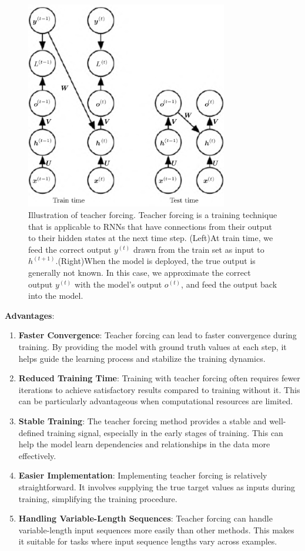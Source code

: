 \documentclass{report}
\begin{document}
\begin{figure}[ht]
	\includegraphics[width=250pt]{40}
	\centering
	\caption{Illustration of teacher forcing. Teacher forcing is a training technique that is applicable to RNNs that have connections from their output to their hidden states at the next time step. (Left)At train time, we feed the correct output $y^{(t)}$ drawn from the train set as input to $h^{(t+1)}$.(Right)When the model is deployed, the true output is generally not known. In this case, we approximate the correct output $y^{(t)}$ with the model’s output $o^{(t)}$, and feed the output back into the model.}
\end{figure}

\textbf{Advantages}:
\begin{enumerate}
\item \textbf{Faster Convergence}: Teacher forcing can lead to faster convergence during training. By providing the model with ground truth values at each step, it helps guide the learning process and stabilize the training dynamics.

\item \textbf{Reduced Training Time}: Training with teacher forcing often requires fewer iterations to achieve satisfactory results compared to training without it. This can be particularly advantageous when computational resources are limited.

\item \textbf{Stable Training}: The teacher forcing method provides a stable and well-defined training signal, especially in the early stages of training. This can help the model learn dependencies and relationships in the data more effectively.

\item \textbf{Easier Implementation}: Implementing teacher forcing is relatively straightforward. It involves supplying the true target values as inputs during training, simplifying the training procedure.

\item \textbf{Handling Variable-Length Sequences}: Teacher forcing can handle variable-length input sequences more easily than other methods. This makes it suitable for tasks where input sequence lengths vary across examples.
\end{enumerate}
\end{document}
